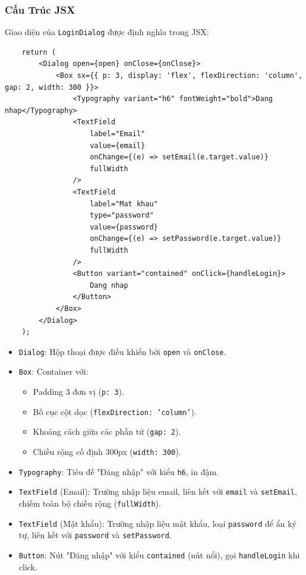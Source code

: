             \subsubsection{Cấu Trúc JSX}
                \hspace*{0.6cm}Giao diện của \texttt{LoginDialog} được định nghĩa trong JSX:
                \begin{lstlisting}
    return (
        <Dialog open={open} onClose={onClose}>
            <Box sx={{ p: 3, display: 'flex', flexDirection: 'column', gap: 2, width: 300 }}>
                <Typography variant="h6" fontWeight="bold">Dang nhap</Typography>
                <TextField
                    label="Email"
                    value={email}
                    onChange={(e) => setEmail(e.target.value)}
                    fullWidth
                />
                <TextField
                    label="Mat khau"
                    type="password"
                    value={password}
                    onChange={(e) => setPassword(e.target.value)}
                    fullWidth
                />
                <Button variant="contained" onClick={handleLogin}>
                    Dang nhap
                </Button>
            </Box>
        </Dialog>
    );
                \end{lstlisting}
                \begin{itemize}
                    \item \texttt{Dialog}: Hộp thoại được điều khiển bởi \texttt{open} và \texttt{onClose}.
                    \item \texttt{Box}: Container với:
                    \begin{itemize}
                        \item Padding 3 đơn vị (\texttt{p: 3}).
                        \item Bố cục cột dọc (\texttt{flexDirection: 'column'}).
                        \item Khoảng cách giữa các phần tử (\texttt{gap: 2}).
                        \item Chiều rộng cố định 300px (\texttt{width: 300}).
                    \end{itemize}
                    \item \texttt{Typography}: Tiêu đề "Đăng nhập" với kiểu \texttt{h6}, in đậm.
                    \item \texttt{TextField} (Email): Trường nhập liệu email, liên kết với \texttt{email} và \texttt{setEmail}, chiếm toàn bộ chiều rộng (\texttt{fullWidth}).
                    \item \texttt{TextField} (Mật khẩu): Trường nhập liệu mật khẩu, loại \texttt{password} để ẩn ký tự, liên kết với \texttt{password} và \texttt{setPassword}.
                    \item \texttt{Button}: Nút "Đăng nhập" với kiểu \texttt{contained} (nút nổi), gọi \texttt{handleLogin} khi click.
                \end{itemize}

